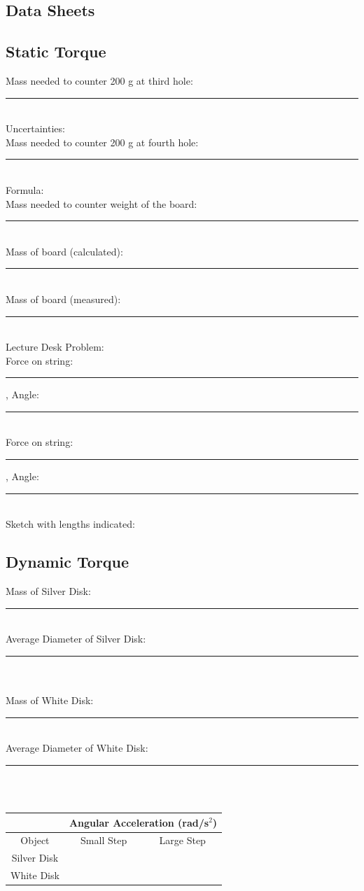 \documentclass[main.tex]{subfiles}
\begin{document}
\newpage
\begin{doublespace}
\section{Data Sheets}
\subsection*{Static Torque}
Mass needed to counter 200 g at third hole:\rule[-1mm]{2.5cm}{.1pt}\\
Uncertainties: \\[3cm]
Mass needed to counter 200 g at fourth hole:\rule[-1mm]{2.5cm}{.1pt}\\
Formula:\\[3cm]
Mass needed to counter weight of the board:\rule[-1mm]{2.5cm}{.1pt}\\
Mass of board (calculated):\rule[-1mm]{2.5cm}{.1pt}\\
Mass of board (measured):\rule[-1mm]{2.5cm}{.1pt}\\[1cm]
Lecture Desk Problem:\\
Force on string:\rule[-1mm]{2.5cm}{.1pt}, Angle:\rule[-1mm]{2.5cm}{.1pt}\\
Force on string:\rule[-1mm]{2.5cm}{.1pt}, Angle:\rule[-1mm]{2.5cm}{.1pt}\\
Sketch with lengths indicated:

\newpage
\subsection*{Dynamic Torque}
Mass of Silver Disk:\rule[-1mm]{2.5cm}{.1pt}\\
Average Diameter of Silver Disk:\rule[-1mm]{2.5cm}{.1pt}\\ \\
Mass of White Disk:\rule[-1mm]{2.5cm}{.1pt}\\
Average Diameter of White Disk:\rule[-1mm]{2.5cm}{.1pt}\\ \\


\begin{tabular}{c|c|c|}
\cline{2-3}
&\multicolumn{2}{|c|}{Angular Acceleration (rad/s$^2$)}\\
\hline
\multicolumn{1}{|c|}{Object} & Small Step & Large Step\\ \hline
\multicolumn{1}{|c|}{Silver Disk} &&\\ \hline
\multicolumn{1}{|c|}{White Disk}&&\\ \hline
\end{tabular}



\end{doublespace}
\end{document}
